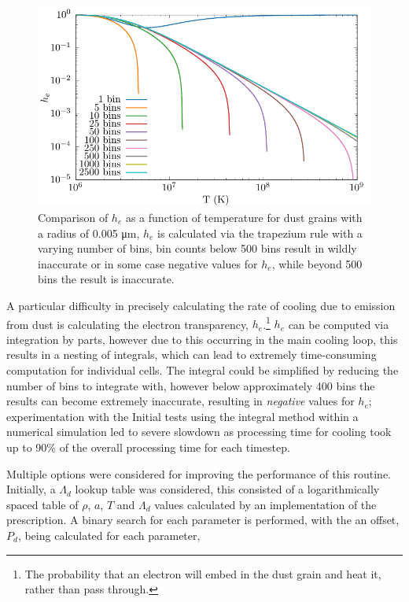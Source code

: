 
\begin{figure}
  \centering
  \includegraphics{assets/he_accuracy/he_acc.pdf}
  \caption[$h_e$ integration accuracy comparison]{Comparison of $h_e$ as a function of temperature for dust grains with a radius of 0.005 \si{\micro\metre}, $h_e$ is calculated via the trapezium rule with a varying number of bins, bin counts below 500 bins result in wildly inaccurate or in some case negative values for $h_e$, while beyond 500 bins the result is inaccurate.}
  \label{fig:he-accuracy-bins}
\end{figure}

A particular difficulty in precisely calculating the rate of cooling due to emission from dust is calculating the electron transparency, $h_e$.\footnote{The probability that an electron will embed in the dust grain and heat it, rather than pass through.}
$h_e$ can be computed via integration by parts, however due to this occurring in the main cooling loop, this results in a nesting of integrals, which can lead to extremely time-consuming computation for individual cells.
The integral could be simplified by reducing the number of bins to integrate with, however below approximately 400 bins the results can become extremely inaccurate, resulting in \textit{negative} values for $h_e$; experimentation with the 
Initial tests using the integral method within a numerical simulation led to severe slowdown as processing time for cooling took up to 90\% of the overall processing time for each timestep.

Multiple options were considered for improving the performance of this routine.
Initially, a $\Lambda_d$ lookup table was considered, this consisted of a logarithmically spaced table of $\rho$, $a$, $T$ and $\Lambda_d$ values calculated by an implementation of the \cite{dwek_infrared_1981} prescription. 
A binary search for each parameter is performed, with the an offset, $P_d$, being calculated for each parameter,

